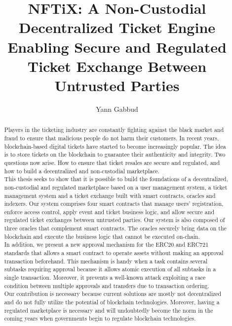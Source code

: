 \documentclass[a4paper,11pt,oneside]{report}
\title{NFTiX: A Non-Custodial Decentralized Ticket Engine Enabling Secure and Regulated Ticket Exchange Between Untrusted Parties}
\author{Yann Gabbud}
\affiliation{Distributed Computing Laboratory \\
and \\
Secutix SA, an ELCA company \\}
\begin{document}
\maketitle
\makeacks

\begin{abstract}
Players in the ticketing industry are constantly fighting against the black market and fraud to ensure that malicious people do not harm their customers. In recent years, blockchain-based digital tickets have started to become increasingly popular. The idea is to store tickets on the blockchain to guarantee their authenticity and integrity. Two questions now arise. How to ensure that ticket resales are secure and regulated, and how to build a decentralized and non-custodial marketplace. \\

This thesis seeks to show that it is possible to build the foundations of a decentralized, non-custodial and regulated marketplace based on a user management system, a ticket management system and a ticket exchange built with smart contracts, oracles and indexers. Our system comprises four smart contracts that manage users' registration, enforce access control, apply event and ticket business logic, and allow secure and regulated ticket exchanges between untrusted parties. Our system is also composed of three oracles that complement smart contracts. The oracles securely bring data on the blockchain and execute the business logic that cannot be executed on-chain. \\

In addition, we present a new approval mechanism for the ERC20 and ERC721 standards that allows a smart contract to operate assets without making an approval transaction beforehand. This mechanism is handy when a task contains several subtasks requiring approval because it allows atomic execution of all subtasks in a single transaction. Moreover, it prevents a well-known attack exploiting a race condition between multiple approvals and transfers due to transaction ordering. \\

Our contribution is necessary because current solutions are mostly not decentralized and do not fully utilize the potential of blockchain technologies. Moreover, having a regulated marketplace is necessary and will undoubtedly become the norm in the coming years when governments begin to regulate blockchain technologies. \\
\end{abstract}
\end{document}
